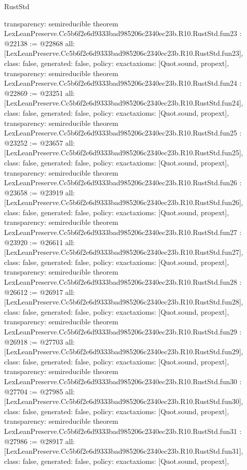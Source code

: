\begin{lexlean}{RustStd}
\begin{coremodule}
{  transparency: semireducible
}
theorem LexLeanPreserve.Cc5b6f2e6d9333bad985206c2340ec23b.R10.RustStd.fun23 : @22138 := @22868 {
  all: [LexLeanPreserve.Cc5b6f2e6d9333bad985206c2340ec23b.R10.RustStd.fun23],
  class: false,
  generated: false,
  policy: exact{axioms: [Quot.sound, propext]},
  transparency: semireducible
}
theorem LexLeanPreserve.Cc5b6f2e6d9333bad985206c2340ec23b.R10.RustStd.fun24 : @22869 := @23251 {
  all: [LexLeanPreserve.Cc5b6f2e6d9333bad985206c2340ec23b.R10.RustStd.fun24],
  class: false,
  generated: false,
  policy: exact{axioms: [Quot.sound, propext]},
  transparency: semireducible
}
theorem LexLeanPreserve.Cc5b6f2e6d9333bad985206c2340ec23b.R10.RustStd.fun25 : @23252 := @23657 {
  all: [LexLeanPreserve.Cc5b6f2e6d9333bad985206c2340ec23b.R10.RustStd.fun25],
  class: false,
  generated: false,
  policy: exact{axioms: [Quot.sound, propext]},
  transparency: semireducible
}
theorem LexLeanPreserve.Cc5b6f2e6d9333bad985206c2340ec23b.R10.RustStd.fun26 : @23658 := @23919 {
  all: [LexLeanPreserve.Cc5b6f2e6d9333bad985206c2340ec23b.R10.RustStd.fun26],
  class: false,
  generated: false,
  policy: exact{axioms: [Quot.sound, propext]},
  transparency: semireducible
}
theorem LexLeanPreserve.Cc5b6f2e6d9333bad985206c2340ec23b.R10.RustStd.fun27 : @23920 := @26611 {
  all: [LexLeanPreserve.Cc5b6f2e6d9333bad985206c2340ec23b.R10.RustStd.fun27],
  class: false,
  generated: false,
  policy: exact{axioms: [Quot.sound, propext]},
  transparency: semireducible
}
theorem LexLeanPreserve.Cc5b6f2e6d9333bad985206c2340ec23b.R10.RustStd.fun28 : @26612 := @26917 {
  all: [LexLeanPreserve.Cc5b6f2e6d9333bad985206c2340ec23b.R10.RustStd.fun28],
  class: false,
  generated: false,
  policy: exact{axioms: [Quot.sound, propext]},
  transparency: semireducible
}
theorem LexLeanPreserve.Cc5b6f2e6d9333bad985206c2340ec23b.R10.RustStd.fun29 : @26918 := @27703 {
  all: [LexLeanPreserve.Cc5b6f2e6d9333bad985206c2340ec23b.R10.RustStd.fun29],
  class: false,
  generated: false,
  policy: exact{axioms: [Quot.sound, propext]},
  transparency: semireducible
}
theorem LexLeanPreserve.Cc5b6f2e6d9333bad985206c2340ec23b.R10.RustStd.fun30 : @27704 := @27985 {
  all: [LexLeanPreserve.Cc5b6f2e6d9333bad985206c2340ec23b.R10.RustStd.fun30],
  class: false,
  generated: false,
  policy: exact{axioms: [Quot.sound, propext]},
  transparency: semireducible
}
theorem LexLeanPreserve.Cc5b6f2e6d9333bad985206c2340ec23b.R10.RustStd.fun31 : @27986 := @28917 {
  all: [LexLeanPreserve.Cc5b6f2e6d9333bad985206c2340ec23b.R10.RustStd.fun31],
  class: false,
  generated: false,
  policy: exact{axioms: [Quot.sound, propext]},
}
\end{coremodule}
\end{lexlean}
